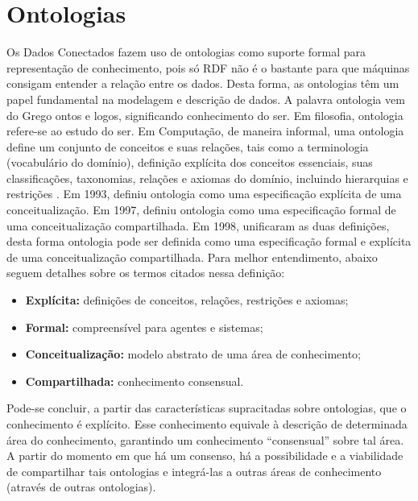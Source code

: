 \section{Ontologias}
Os Dados Conectados fazem uso de ontologias como suporte formal para representação de conhecimento, pois só RDF não é o bastante para que máquinas consigam entender a relação entre os dados. Desta forma, as ontologias têm um papel fundamental na modelagem e descrição de dados. A palavra ontologia vem do Grego ontos e logos, significando conhecimento do ser. Em filosofia, ontologia refere-se ao estudo do ser. Em Computação, de maneira informal, uma ontologia define um conjunto de conceitos e suas relações, tais como a terminologia (vocabulário do domínio), definição explícita dos conceitos essenciais, suas classificações, taxonomias, relações e axiomas do domínio, incluindo hierarquias e restrições \cite{deved2006semantic}. Em 1993, \citeauthor{gruber1993translation} definiu ontologia como uma especificação explícita de uma conceitualização. Em 1997, \citeauthor{borstw1997construction} definiu ontologia como uma especificação formal de uma conceitualização compartilhada. Em 1998, \citeauthor{studer1998knowledge} unificaram as duas definições, desta forma ontologia pode ser definida como uma especificação formal e explícita de uma conceitualização compartilhada. Para melhor entendimento, abaixo seguem detalhes sobre os termos citados nessa definição: 
% 
% 
\begin{itemize}
	\item \textbf{Explícita:} definições de conceitos, relações, restrições e axiomas; 
	\item \textbf{Formal:} compreensível para agentes e sistemas; 
	\item \textbf{Conceitualização:} modelo abstrato de uma área de conhecimento; 
	\item \textbf{Compartilhada:} conhecimento consensual. 
\end{itemize}
Pode-se concluir, a partir das características supracitadas sobre ontologias, que o conhecimento é explícito. Esse conhecimento equivale à descrição de determinada área do conhecimento, garantindo um conhecimento “consensual” sobre tal área. A partir do momento em que há um consenso, há a possibilidade e a viabilidade de compartilhar tais ontologias e integrá-las a outras áreas de conhecimento (através de outras ontologias).


